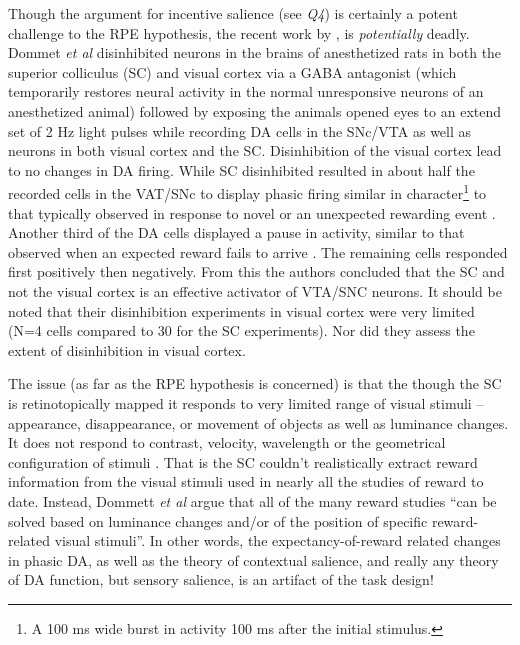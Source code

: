 \documentclass[doc]{apa}        %
\begin{document}
Though the argument for incentive salience (see \emph{Q4}) is certainly a potent challenge to the RPE hypothesis, the recent work by , is \emph{potentially} deadly.  Dommet \emph{et al} disinhibited neurons in the brains of anesthetized rats in both the superior colliculus (SC) and visual cortex via a GABA antagonist (which temporarily restores neural activity in the normal unresponsive neurons of an anesthetized animal) followed by exposing the animals opened eyes to an extend set of 2 Hz light pulses while recording DA cells in the SNc/VTA as well as neurons in both visual cortex and the SC.  Disinhibition of the visual cortex lead to no changes in DA firing.  While SC disinhibited resulted in about half the recorded cells in the VAT/SNc to display phasic firing similar in character\footnote{A 100 ms wide burst in activity 100 ms after the initial stimulus.} to that typically observed in response to novel \cite{Axmacher:2010p7226} or an unexpected rewarding event \cite{Mirenowicz:1994p7185}.  Another third of the DA cells displayed a pause in activity, similar to that observed when an expected reward fails to arrive \cite{Mirenowicz:1994p7185}.  The remaining cells responded first positively then negatively.  From this the authors concluded that the SC and not the visual cortex is an effective activator of VTA/SNC neurons.  It should be noted that their disinhibition experiments in visual cortex were very limited (N=4 cells compared to 30 for the SC experiments).  Nor did they assess the extent of disinhibition in visual cortex.

The issue (as far as the RPE hypothesis is concerned) is that the though the SC is retinotopically mapped it responds to very limited range of visual stimuli -- appearance, disappearance, or movement of objects as well as luminance changes.  It does not respond to contrast, velocity, wavelength or the geometrical configuration of stimuli \cite{Dommett:2005p7263}. That is the SC couldn't realistically extract reward information from the visual stimuli used in nearly all the studies of reward to date.  Instead, Dommett \emph{et al} argue that all of the many reward studies ``can be solved based on luminance changes and/or of the position of specific reward-related visual stimuli''.  In other words, the expectancy-of-reward related changes in phasic DA, as well as the theory of contextual salience, and really any theory of DA function, but sensory salience, is an artifact of the task design!  
\end{document}
